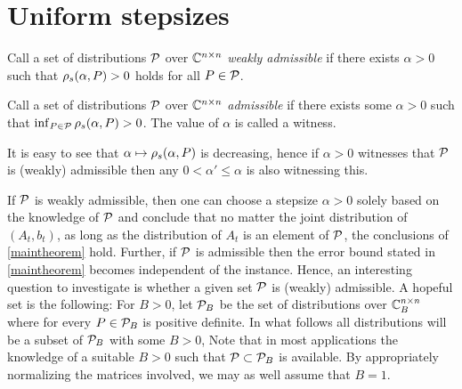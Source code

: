 \section{Uniform stepsizes}
\begin{definition}
Call a set of distributions $\P$ over $\C^{\ncn}$
\emph{weakly admissible} if there exists $\alpha>0$ such that
$\rhos{P}>0$ holds for all $P\in \P$.
\end{definition}
\begin{definition}
Call a set of distributions $\P$ over $\C^{\ncn}$ \emph{admissible}
if there exists some $\alpha>0$ such that $\inf_{P\in \P} \rhos{P}>0$.
The value of $\alpha$ is called a witness.
\end{definition}
It is easy to see that $\alpha \mapsto \rhos{P}$ is decreasing,
hence if $\alpha>0$ witnesses that $\P$ is (weakly) admissible
then any $0<\alpha'\le \alpha$ is also witnessing this.

If $\P$ is weakly admissible, then one can choose a stepsize $\alpha>0$ solely based on the knowledge of $\P$ and
conclude that no matter the joint distribution of $(A_t,b_t)$, as long as the distribution of $A_t$ is an element of $\P$, the conclusions of \cref{maintheorem} hold. Further, if $\P$ is admissible then the error bound stated in  \cref{maintheorem} becomes independent of the instance.
Hence, an interesting question to investigate is whether a given set $\P$ is (weakly) admissible.
A hopeful set is the following:
For $B>0$, let $\P_B$ be the set of distributions over $\C_B^{\ncn}$ where for every $P\in \P_B$ is positive definite.
In what follows all distributions will be a subset of $\P_B$ with some $B>0$,
Note that in most applications the knowledge of a suitable $B>0$ such that $\P\subset \P_B$ is available.
By appropriately normalizing the matrices involved, we may as well assume that $B=1$.


